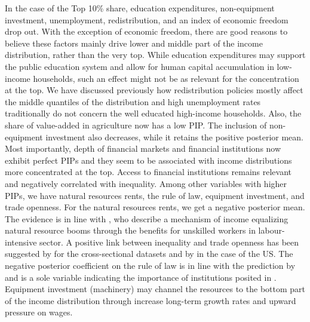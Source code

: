 \begin{refsection}
In the case of the Top 10\% share, education expenditures, non-equipment investment, unemployment, redistribution, and an index of economic freedom drop out. With the exception of economic freedom, there are good reasons to believe these factors mainly drive lower and middle part of the income distribution, rather than the very top. While education expenditures may support the public education system and allow for human capital accumulation in low-income households, such an effect might not be as relevant for the concentration at the top. We have discussed previously how redistribution policies mostly affect the middle quantiles of the distribution and high unemployment rates traditionally do not concern the well educated high-income households. Also, the share of value-added in agriculture now has a low \ac{PIP}. The inclusion of non-equipment investment also decreases, while it retains the positive posterior mean. Most importantly, depth of financial markets and financial institutions now exhibit perfect \acp{PIP} and they seem to be associated with income distributions more concentrated at the top. Access to financial institutions remains relevant and negatively correlated with inequality. Among other variables with higher \acp{PIP}, we have natural resources rents, the rule of law, equipment investment, and trade openness. For the natural resources rents, we get a negative posterior mean. The evidence is in line with \textcite{goderismalone2011}, who describe a mechanism of income equalizing natural resource booms through the benefits for unskilled workers in labour-intensive sector. A positive link between inequality and trade openness has been suggested by \textcite{Jaumotte2013,dabla2015causes} for the cross-sectional datasets and by \textcite{milanovicvan2018inequality} in the case of the US. The negative posterior coefficient on the rule of law is in line with the prediction by \textcite{perotti2007investor} and is a sole variable indicating the importance of institutions posited in \textcite{acemoglu2003cross,acemoglu2015rise}. Equipment investment (machinery) may channel the resources to the bottom part of the income distribution through increase long-term growth rates and upward pressure on wages.


\end{refsection}
